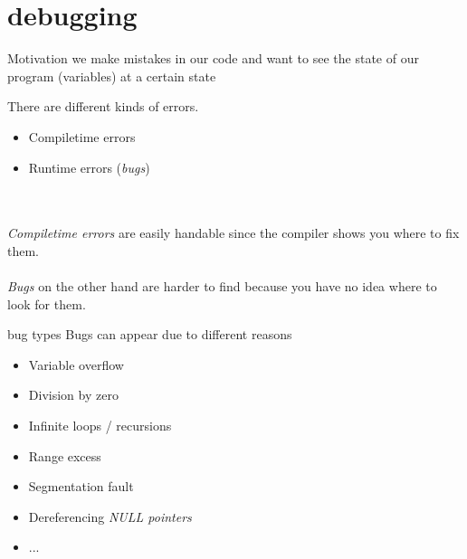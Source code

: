 \documentclass[10pt,graphics,aspectratio=169,table]{beamer}
\begin{document}
\section{debugging}
\begin{frame}{Motivation}
we make mistakes in our code and want to see the state of our program (variables) at a certain state

There are different kinds of errors.
	\begin{itemize}
		\item Compiletime errors
		\item Runtime errors (\textit{bugs})
	\end{itemize}\ \\\ \\
	\textit{Compiletime errors} are easily handable since the compiler shows you where to fix them.\\\ \\
	\textit{Bugs} on the other hand are harder to find because you have no idea where to look for them.
\end{frame}

\begin{frame}{bug types}
	Bugs can appear due to different reasons
	\begin{itemize}
		\item Variable overflow
		\item Division by zero
		\item Infinite loops / recursions
		\item Range excess
		\item Segmentation fault
		\item Dereferencing \textit{NULL pointers}
		\item ...
	\end{itemize}
\end{frame}
\end{document}
